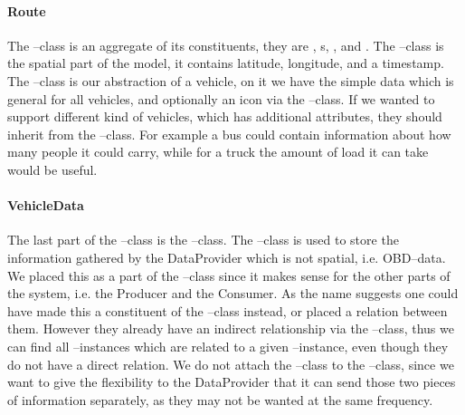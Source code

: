 \paragraph*{Route}
The --class is an aggregate of its constituents, they are , s, , and . 
The --class is the spatial part of the model, it contains latitude, longitude, and a timestamp.
The --class is our abstraction of a vehicle, on it we have the simple data which is general for all vehicles, and optionally an icon via the --class.
If we wanted to support different kind of vehicles, which has additional attributes, they should inherit from the --class.
For example a bus could contain information about how many people it could carry, while for a truck the amount of load it can take would be useful. 

\paragraph*{VehicleData}
The last part of the --class is the --class. 
The --class is used to store the information gathered by the DataProvider which is not spatial, i.e. \ac{OBD}--data.
We placed this as a part of the --class since it makes sense for the other parts of the system, i.e. the Producer and the Consumer. 
As the name suggests one could have made this a constituent of the --class instead, or placed a relation between them.
However they already have an indirect relationship via the --class, 
thus we can find all --instances which are related to a given --instance, even though they do not have a direct relation. 
We do not attach the --class to the --class, 
since we want to give the flexibility to the DataProvider that it can send those two pieces of information separately, as they may not be wanted at the same frequency. 

